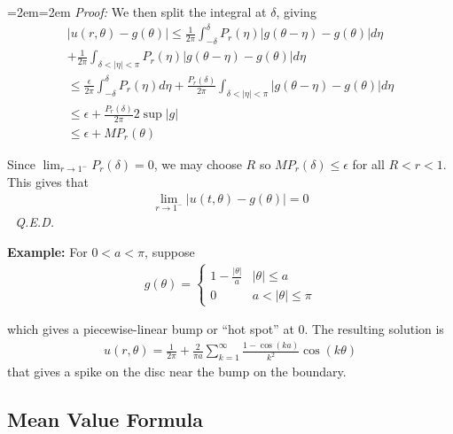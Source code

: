 \documentclass{article}
\newcounter{result}[section]
\newenvironment{pf}{%
	\par%
	\medskip
	\leftskip=2em\rightskip=2em%
	\noindent\ignorespaces \textit{Proof:} \newline}{%
	\,\, \newline \textit{Q.E.D.}\par\medskip}
\begin{document}
\begin{pf}
		We then split the integral at $\delta$, giving 
		\begin{align*}
			|u(r,\theta) - g(\theta)| \leq \frac{1}{2\pi} \int_{-\delta}^{\delta} P_{r}(\eta) |g(\theta - \eta) - g(\theta)| d\eta \\ + \frac{1}{2\pi} \int_{\delta < |\eta| < \pi} P_{r}(\eta) |g(\theta - \eta) - g(\theta)| d\eta \\
			\leq \frac{\epsilon}{2\pi} \int_{-\delta}^{\delta} P_{r}(\eta) d\eta + \frac{P_{r}(\delta)}{2\pi} \int_{\delta < |\eta| < \pi} |g(\theta - \eta) - g(\theta)|d\eta \\
			\leq \epsilon + \frac{P_{r}(\delta)}{2\pi} 2 \sup |g| \\
			\leq  \epsilon + M P_{r}(\theta)
		\end{align*}
		
		Since $\lim_{r \to 1^-} P_{r}(\delta) = 0$, we may choose $R$ so $M P_{r}(\delta) \leq \epsilon$ for all $R < r < 1$. This gives that 
		\begin{align*}
			\lim_{r \to 1^-} |u(t,\theta) - g(\theta)| = 0
		\end{align*}
	\end{pf}
	
	
	
	
	\vspace{0.25 cm}
	\textbf{Example:} For $0 < a < \pi$, suppose 
	\begin{align*}
		g(\theta) = \begin{cases}
			1 - \frac{|\theta|}{a} & |\theta| \leq a \\
			0 & a < |\theta| \leq \pi
		\end{cases}
	\end{align*}
	
	which gives a piecewise-linear bump or ``hot spot'' at $0$. The resulting solution is 
	\begin{align*}
		u(r,\theta) = \frac{1}{2\pi} + \frac{2}{\pi a} \sum_{k=1}^{\infty} \frac{1 - \cos(ka)}{k^{2}} \cos(k\theta)
	\end{align*}
	that gives a spike on the disc near the bump on the boundary. 
	
	\vspace{0.25 cm}
	
	\subsection{Mean Value Formula}
	
\end{document}

